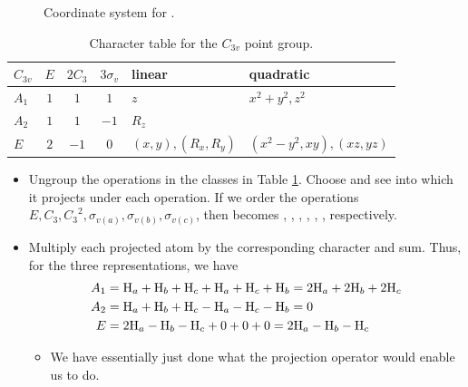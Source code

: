 \documentclass[../notes.tex]{subfiles}
\begin{document}
\begin{itemize}
\begin{figure}[H]
        \caption{Coordinate system for .}
        \label{fig:coordinates-NH3}
    \end{figure}
    \begin{table}[h!]
        \centering
        \small
        \renewcommand{\arraystretch}{1.2}
        \begin{tabular}{l|ccc|l|l}
            $C_{3v}$ & $E$ & $2C_3$ & $3\sigma_v$ & linear & quadratic\\
            \hline
            $A_1$ & $1$ & $1$ & $1$ & $z$ & $x^2+y^2,z^2$\\
            $A_2$ & $1$ & $1$ & $-1$ & $R_z$ & \\
            $E$ & $2$ & $-1$ & $0$ & $(x,y),(R_x,R_y)$ & $(x^2-y^2,xy),(xz,yz)$\\
        \end{tabular}
        \caption{Character table for the $C_{3v}$ point group.}
        \label{tab:characterTable-C3v}
    \end{table}
    \begin{itemize}
        \item Ungroup the operations in the classes in Table \ref{tab:characterTable-C3v}. Choose  and see into which  it projects under each operation. If we order the operations $E,C_3,{C_3}^2,\sigma_{v(a)},\sigma_{v(b)},\sigma_{v(c)}$, then  becomes , , , , , , respectively.
        \item Multiply each projected atom by the corresponding character and sum. Thus, for the three representations, we have
        \begin{align*}
            A_1 &= \ce{H_{$a$}}+\ce{H_{$b$}}+\ce{H_{$c$}}+\ce{H_{$a$}}+\ce{H_{$c$}}+\ce{H_{$b$}} = 2\ce{H_{$a$}}+2\ce{H_{$b$}}+2\ce{H_{$c$}}\\
            A_2 &= \ce{H_{$a$}}+\ce{H_{$b$}}+\ce{H_{$c$}}-\ce{H_{$a$}}-\ce{H_{$c$}}-\ce{H_{$b$}} = 0\\
            E &= 2\ce{H_{$a$}}-\ce{H_{$b$}}-\ce{H_{$c$}}+0+0+0 = 2\ce{H_{$a$}}-\ce{H_{$b$}}-\ce{H_{$c$}}
        \end{align*}
        \begin{itemize}
            \item We have essentially just done what the projection operator would enable us to do.

\end{itemize}
\end{itemize}
\end{itemize}
\end{document}
